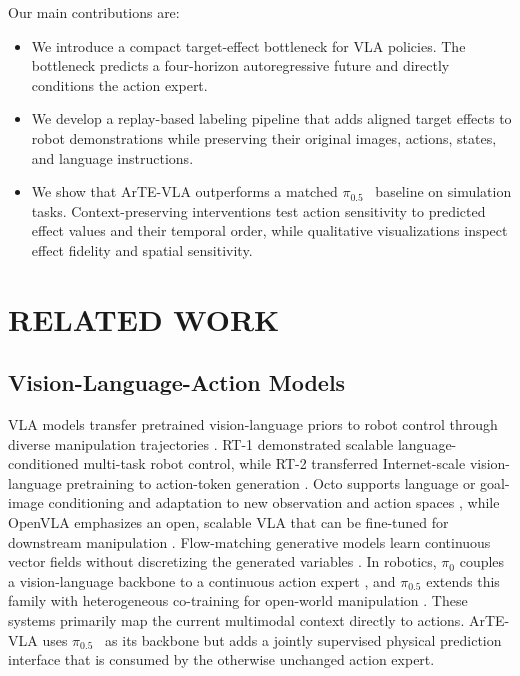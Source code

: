 \documentclass[letterpaper,10pt,conference]{ieeeconf}
\newcommand{\method}{ArTE-VLA}
\newcommand{\pihalf}{\ensuremath{\pi_{0.5}}}
\begin{document}
Our main contributions are:
\begin{itemize}
    \item We introduce a compact target-effect bottleneck for VLA policies.
    The bottleneck predicts a four-horizon autoregressive future and directly conditions the action expert.
    \item We develop a replay-based labeling pipeline that adds aligned target effects to robot demonstrations while preserving their original images, actions, states, and language instructions.
    \item We show that \method{} outperforms a matched \pihalf{}~\cite{pi05} baseline on simulation tasks.
    Context-preserving interventions test action sensitivity to predicted effect values and their temporal order, while qualitative visualizations inspect effect fidelity and spatial sensitivity.
\end{itemize}


\section{RELATED WORK}
\label{sec:related_work}

\subsection{Vision-Language-Action Models}

VLA models transfer pretrained vision-language priors to robot control through diverse manipulation trajectories \cite{openvla}.
RT-1 demonstrated scalable language-conditioned multi-task robot control, while RT-2 transferred Internet-scale vision-language pretraining to action-token generation \cite{rt1,rt2}.
Octo supports language or goal-image conditioning and adaptation to new observation and action spaces \cite{octo}, while OpenVLA emphasizes an open, scalable VLA that can be fine-tuned for downstream manipulation \cite{openvla}.
Flow-matching generative models learn continuous vector fields without discretizing the generated variables \cite{lipman2023flow}.
In robotics, $\pi_0$ couples a vision-language backbone to a continuous action expert \cite{pi0}, and \pihalf{} extends this family with heterogeneous co-training for open-world manipulation \cite{pi05}.
These systems primarily map the current multimodal context directly to actions.
\method{} uses \pihalf{}~\cite{pi05} as its backbone but adds a jointly supervised physical prediction interface that is consumed by the otherwise unchanged action expert.
\end{document}
